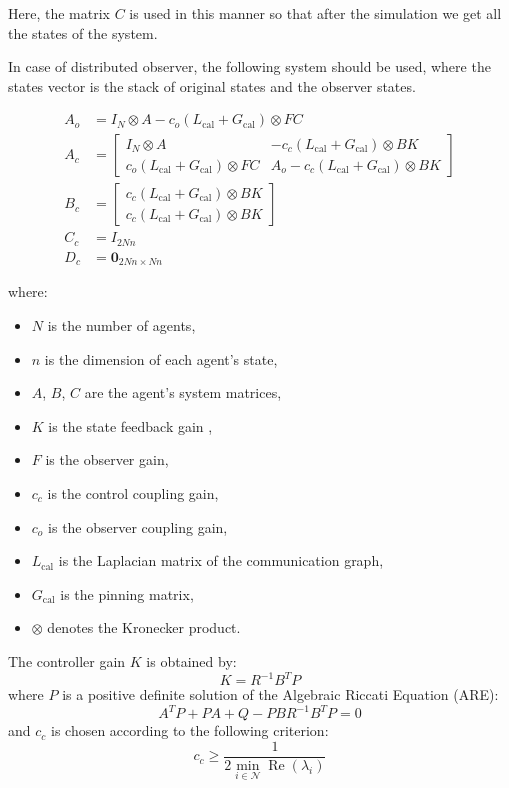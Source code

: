 Here, the matrix $C$ is used in this manner so that after the simulation we get all the states of the system.

In case of distributed observer, the following system should be used, where the states vector is the stack of original states and the observer states.

\begin{align*}
A_o &= I_N \otimes A - c_o (L_{\text{cal}} + G_{\text{cal}}) \otimes F C \\
A_c &= 
\begin{bmatrix}
I_N \otimes A & -c_c (L_{\text{cal}} + G_{\text{cal}}) \otimes B K \\
c_o (L_{\text{cal}} + G_{\text{cal}}) \otimes F C & 
A_o - c_c (L_{\text{cal}} + G_{\text{cal}}) \otimes B K
\end{bmatrix} \\
B_c &= 
\begin{bmatrix}
c_c (L_{\text{cal}} + G_{\text{cal}}) \otimes B K \\
c_c (L_{\text{cal}} + G_{\text{cal}}) \otimes B K
\end{bmatrix} \\
C_c &= I_{2Nn} \\
D_c &= \mathbf{0}_{2Nn \times Nn}
\end{align*}

where:
\begin{itemize}
  \item $N$ is the number of agents,
  \item $n$ is the dimension of each agent's state,
  \item $A$, $B$, $C$ are the agent's system matrices,
  \item $K$ is the state feedback gain ,
  \item $F$ is the observer gain,
  \item $c_c$ is the control coupling gain,
  \item $c_o$ is the observer coupling gain,
  \item $L_{\text{cal}}$ is the Laplacian matrix of the communication graph,
  \item $G_{\text{cal}}$ is the pinning matrix,
  \item $\otimes$ denotes the Kronecker product.
\end{itemize}

The controller gain $K$ is obtained by:
\begin{equation} 
K = R^{-1} B^{T} P
\end{equation}
where $P$ is a positive definite solution of the Algebraic Riccati Equation (ARE):
\begin{equation} 
A^{T} P + P A + Q - P B R^{-1} B^{T} P = 0
\end{equation}
and $c_c$ is chosen according to the following criterion:
\begin{equation}
c_c \geq \frac{1}{2 \min\limits_{i \in \mathcal{N}} \operatorname{Re}(\lambda_i)}
\end{equation}


